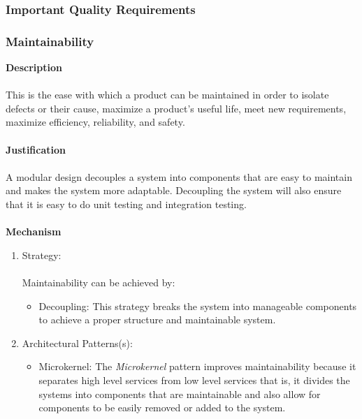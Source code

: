 \documentclass[hidelinks, 12pt, oneside]{article}
\begin{document}
		\subsubsection{Important Quality Requirements}
			\subsubsection*{Maintainability}
			\textbf{Description}\\\\
			This is the ease with which a product can be maintained in order to isolate defects or their cause, maximize a product's useful life, meet new requirements, maximize efficiency, reliability, and safety.\\\\
			\textbf{Justification}\\\\
			A modular design decouples a system into components that are easy to maintain and makes the system more adaptable. Decoupling the system will also ensure that it is easy to do unit testing and integration testing.\\\\
			\textbf{Mechanism}
			\begin{enumerate}
				\item Strategy:\\\\
				Maintainability can be achieved by:
				\begin{itemize}
				\item Decoupling: This strategy breaks the system into manageable components to achieve a proper structure and maintainable system.  
				\end{itemize}
				\item Architectural Patterns(s):
				\begin{itemize}
				\item Microkernel: The \emph{Microkernel} pattern improves maintainability because it separates high level services  from low level services that is, it divides the systems into components that are maintainable and also allow for components to be easily removed or added to the system.
				\end{itemize}
			\end{enumerate}
			\newpage
\end{document}
